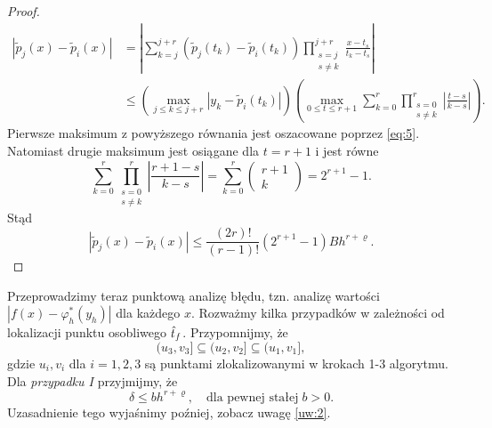 \documentclass[oik, pdftex, robocza, man]{mgrwms}
\begin{document}
\begin{proof}
        \begin{equation} \label{eq:28}
            \begin{aligned}
                \left|\tilde{p}_{j}(x)-\tilde{p}_{i}(x)\right| &=\left|\sum_{k=j}^{j+r}\left(\tilde{p}_{j}\left(t_{k}\right)-\tilde{p}_{i}\left(t_{k}\right)\right) \prod_{\substack{s=j \\ s \neq k}}^{j+r} \frac{x-t_{s}}{t_{k}-t_{s}}\right| \\
                & \leq\left(\max _{j \leq k \leq j+r}\left|y_{k}-\tilde{p}_{i}\left(t_{k}\right)\right|\right)\left(\max _{0 \leq t \leq r+1} \sum_{k=0}^{r} \prod_{\substack{s=0 \\ s \neq k}}^{r}\left|\frac{t-s}{k-s}\right|\right).
            \end{aligned}                
        \end{equation}
        Pierwsze maksimum z powyższego równania jest oszacowane poprzez \eqref{eq:5}. Natomiast drugie maksimum jest osiągane dla $t=r+1$ i jest równe
        \begin{equation*}
            \sum_{k=0}^{r} \prod_{\substack{s=0 \\ s \neq k}}^{r}\left|\frac{r+1-s}{k-s}\right|=\sum_{k=0}^{r}\left(\begin{array}{c} r+1 \\ k\end{array}\right)=2^{r+1}-1.
        \end{equation*}
        Stąd
        \begin{equation*}
            \left|\tilde{p}_{j}(x)-\tilde{p}_{i}(x)\right| \leq \frac{(2 r) !}{(r-1) !}\left(2^{r+1}-1\right) B h^{r+\varrho}.
        \end{equation*}
    \end{proof}

    Przeprowadzimy teraz punktową analizę błędu, tzn. analizę wartości $|f(x) - \varphi_{h}^{*}(y_h)|$ dla każdego $x$. Rozważmy kilka przypadków w zależności od lokalizacji punktu osobliwego $\hat{t}_{f}$. Przypomnijmy, że
    \begin{equation*}
        (u_{3}, v_{3}] \subseteq (u_{2}, v_{2}] \subseteq (u_{1}, v_{1}],
    \end{equation*}
    gdzie $u_{i}, v_{i}$ dla $i=1,2,3$ są punktami zlokalizowanymi w krokach 1-3 algorytmu. Dla \textit{przypadku I} przyjmijmy, że
    \begin{equation} \label{eq:algMP_7}
        \delta \leq bh^{r+\varrho}, \quad \text{dla pewnej stałej}\; b>0.
    \end{equation}
    Uzasadnienie tego wyjaśnimy poźniej, zobacz uwagę \ref{uw:2}.
\end{document}
